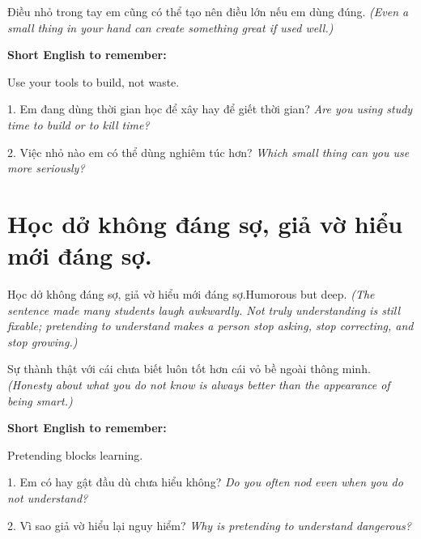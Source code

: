 \begin{baihoc}
Điều nhỏ trong tay em cũng có thể tạo nên điều lớn nếu em dùng đúng.
\textit{(Even a small thing in your hand can create something great if used well.)}
\end{baihoc}

\begin{ghinhoanh}
\textbf{Short English to remember:}

Use your tools to build, not waste.

\end{ghinhoanh}

\begin{tuhocnhanh}
1. Em đang dùng thời gian học để xây hay để giết thời gian? \textit{Are you using study time to build or to kill time?}

2. Việc nhỏ nào em có thể dùng nghiêm túc hơn? \textit{Which small thing can you use more seriously?}
\end{tuhocnhanh}
\ngancach

\section{Học dở không đáng sợ, giả vờ hiểu mới đáng sợ.}
\begin{truyen}{Học dở không đáng sợ, giả vờ hiểu mới đáng sợ.}{Humorous but deep.}
\textit{(The sentence made many students laugh awkwardly. Not truly understanding is still fixable; pretending to understand makes a person stop asking, stop correcting, and stop growing.)}
\end{truyen}

\begin{baihoc}
Sự thành thật với cái chưa biết luôn tốt hơn cái vỏ bề ngoài thông minh.
\textit{(Honesty about what you do not know is always better than the appearance of being smart.)}
\end{baihoc}

\begin{ghinhoanh}
\textbf{Short English to remember:}

Pretending blocks learning.

\end{ghinhoanh}

\begin{tuhocnhanh}
1. Em có hay gật đầu dù chưa hiểu không? \textit{Do you often nod even when you do not understand?}

2. Vì sao giả vờ hiểu lại nguy hiểm? \textit{Why is pretending to understand dangerous?}
\end{tuhocnhanh}
\ngancach

